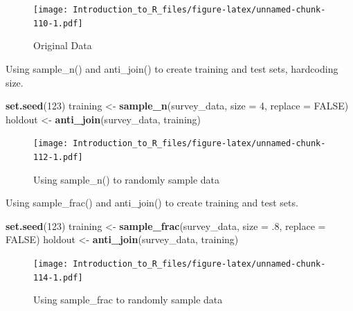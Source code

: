\documentclass[]{book}
\newenvironment{Shaded}{\begin{snugshade}}{\end{snugshade}}
\newcommand{\DataTypeTok}[1]{\textcolor[rgb]{0.13,0.29,0.53}{#1}}
\newcommand{\DecValTok}[1]{\textcolor[rgb]{0.00,0.00,0.81}{#1}}
\newcommand{\FloatTok}[1]{\textcolor[rgb]{0.00,0.00,0.81}{#1}}
\newcommand{\KeywordTok}[1]{\textcolor[rgb]{0.13,0.29,0.53}{\textbf{#1}}}
\newcommand{\NormalTok}[1]{#1}
\newcommand{\OtherTok}[1]{\textcolor[rgb]{0.56,0.35,0.01}{#1}}
\newcommand{\StringTok}[1]{\textcolor[rgb]{0.31,0.60,0.02}{#1}}
\theoremstyle{definition}
\theoremstyle{definition}
\theoremstyle{definition}
\theoremstyle{remark}
\let\BeginKnitrBlock\begin \let\EndKnitrBlock\end
\begin{document}
\begin{figure}
\centering
\texttt{[image: Introduction\_to\_R\_files/figure-latex/unnamed-chunk-110-1.pdf]}
\caption{\label{fig:unnamed-chunk-110}Original Data}
\end{figure}

\BeginKnitrBlock{example}
\protect\hypertarget{exm:samplen1}{}{\label{exm:samplen1} }Using sample\_n() and anti\_join() to create training and test sets, hardcoding size.
\EndKnitrBlock{example}

\begin{Shaded}
\begin{Highlighting}[]
\KeywordTok{set.seed}\NormalTok{(}\DecValTok{123}\NormalTok{)}
\NormalTok{training <-}\StringTok{ }\KeywordTok{sample_n}\NormalTok{(survey_data, }\DataTypeTok{size =} \DecValTok{4}\NormalTok{, }\DataTypeTok{replace =} \OtherTok{FALSE}\NormalTok{)}
\NormalTok{holdout <-}\StringTok{ }\KeywordTok{anti_join}\NormalTok{(survey_data, training)}
\end{Highlighting}
\end{Shaded}

\begin{figure}
\centering
\texttt{[image: Introduction\_to\_R\_files/figure-latex/unnamed-chunk-112-1.pdf]}
\caption{\label{fig:unnamed-chunk-112}Using sample\_n() to randomly sample data}
\end{figure}

\BeginKnitrBlock{example}
\protect\hypertarget{exm:samplefrac}{}{\label{exm:samplefrac} }Using sample\_frac() and anti\_join() to create training and test sets.
\EndKnitrBlock{example}

\begin{Shaded}
\begin{Highlighting}[]
\KeywordTok{set.seed}\NormalTok{(}\DecValTok{123}\NormalTok{)}
\NormalTok{training <-}\StringTok{ }\KeywordTok{sample_frac}\NormalTok{(survey_data, }\DataTypeTok{size =} \FloatTok{.8}\NormalTok{, }\DataTypeTok{replace =} \OtherTok{FALSE}\NormalTok{)}
\NormalTok{holdout <-}\StringTok{ }\KeywordTok{anti_join}\NormalTok{(survey_data, training)}
\end{Highlighting}
\end{Shaded}

\begin{figure}
\centering
\texttt{[image: Introduction\_to\_R\_files/figure-latex/unnamed-chunk-114-1.pdf]}
\caption{\label{fig:unnamed-chunk-114}Using sample\_frac to randomly sample data}
\end{figure}
\end{document}
